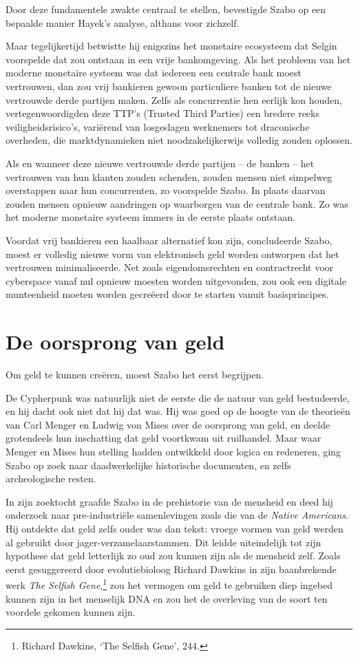 \documentclass[
  a5paper,
  smalldemyvopaper,11pt,twoside,onecolumn,openright,extrafontsizes]{memoir}
\begin{document}
Door deze fundamentele zwakte centraal te stellen, bevestigde Szabo op
een bepaalde manier Hayek's analyse, althans voor zichzelf.

Maar tegelijkertijd betwistte hij enigszins het monetaire ecosysteem dat
Selgin voorspelde dat zou ontstaan in een vrije bankomgeving. Als het
probleem van het moderne monetaire systeem was dat iedereen een centrale
bank moest vertrouwen, dan zou vrij bankieren gewoon particuliere banken
tot de nieuwe vertrouwde derde partijen maken. Zelfs als concurrentie
hen eerlijk kon houden, vertegenwoordigden deze TTP's (Trusted Third
Parties) een bredere reeks veiligheidsrisico's, variërend van
losgeslagen werknemers tot draconische overheden, die marktdynamieken
niet noodzakelijkerwijs volledig zouden oplossen.

Als en wanneer deze nieuwe vertrouwde derde partijen -- de banken -- het
vertrouwen van hun klanten zouden schenden, zouden mensen niet simpelweg
overstappen naar hun concurrenten, zo voorspelde Szabo. In plaats
daarvan zouden mensen opnieuw aandringen op waarborgen van de centrale
bank. Zo was het moderne monetaire systeem immers in de eerste plaats
ontstaan.

Voordat vrij bankieren een haalbaar alternatief kon zijn, concludeerde
Szabo, moest er volledig nieuwe vorm van elektronisch geld worden
ontworpen dat het vertrouwen minimaliseerde. Net zoals eigendomsrechten
en contractrecht voor cyberspace vanaf nul opnieuw moesten worden
uitgevonden, zou ook een digitale munteenheid moeten worden gecreëerd
door te starten vanuit basisprincipes.

\section{De oorsprong van geld}\label{de-oorsprong-van-geld}

Om geld te kunnen creëren, moest Szabo het eerst begrijpen.

De Cypherpunk was natuurlijk niet de eerste die de natuur van geld
bestudeerde, en hij dacht ook niet dat hij dat was. Hij was goed op de
hoogte van de theorieën van Carl Menger en Ludwig von Mises over de
oorsprong van geld, en deelde grotendeels hun inschatting dat geld
voortkwam uit ruilhandel. Maar waar Menger en Mises hun stelling hadden
ontwikkeld door logica en redeneren, ging Szabo op zoek naar
daadwerkelijke historische documenten, en zelfs archeologische resten.

In zijn zoektocht graafde Szabo in de prehistorie van de mensheid en
deed hij onderzoek naar pre-industriële samenlevingen zoals die van de
\emph{Native Americans}. Hij ontdekte dat geld zelfs ouder was dan
tekst: vroege vormen van geld werden al gebruikt door
jager-verzamelaarstammen. Dit leidde uiteindelijk tot zijn hypothese dat
geld letterlijk zo oud zou kunnen zijn als de mensheid zelf. Zoals eerst
gesuggereerd door evolutiebioloog Richard Dawkins in zijn baanbrekende
werk \emph{The Selfish Gene},\footnote{Richard Dawkins, `The Selfish
  Gene', 244.} zou het vermogen om geld te gebruiken diep ingebed kunnen
zijn in het menselijk DNA en zou het de overleving van de soort ten
voordele gekomen kunnen zijn.
\end{document}
